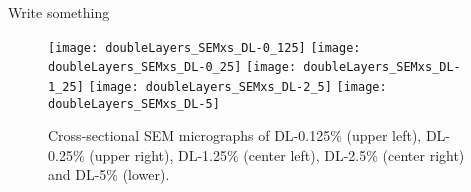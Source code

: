 \documentclass[\main/dresen_thesis.tex]{subfiles}
\begin{document}
  \label{sec:doublelayers:layers:sem}
  Write something
  \begin{figure}[tb]
    \centering
    \texttt{[image: doubleLayers\_SEMxs\_DL-0\_125]} %
    \texttt{[image: doubleLayers\_SEMxs\_DL-0\_25]} %
    \texttt{[image: doubleLayers\_SEMxs\_DL-1\_25]} %
    \texttt{[image: doubleLayers\_SEMxs\_DL-2\_5]} %
    \texttt{[image: doubleLayers\_SEMxs\_DL-5]} %
    \caption{\label{fig:doublelayers:layers:xs}Cross-sectional SEM micrographs of DL-0.125\% (upper left), DL-0.25\% (upper right), DL-1.25\% (center left), DL-2.5\% (center right) and DL-5\% (lower).}
  \end{figure}





\end{document}
